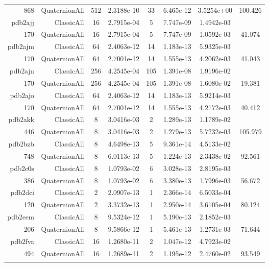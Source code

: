 \begin{xltabular}{\textwidth}{r|rcS[table-format=1.4e+2]cS[table-format=1.3e+2]S[table-format=1.4e+2]S[table-format=-1.3]}
868 & QuaternionAll & 512 & 2.3188e-10 & 33 & 6.465e-12 & 3.5254e+00 & 100.426\\  \addlinespace
pdb2ajj & ClassicAll & 16 & 2.7915e-04 & 5 & 7.747e-09 & 1.4942e-03 & \\
170 & QuaternionAll & 16 & 2.7915e-04 & 5 & 7.747e-09 & 1.0592e-03 & 41.074\\  \addlinespace
pdb2ajm & ClassicAll & 64 & 2.4063e-12 & 14 & 1.183e-13 & 5.9325e-03 & \\
170 & QuaternionAll & 64 & 2.7001e-12 & 14 & 1.555e-13 & 4.2062e-03 & 41.043\\  \addlinespace
pdb2ajn & ClassicAll & 256 & 4.2545e-04 & 105 & 1.391e-08 & 1.9196e-02 & \\
170 & QuaternionAll & 256 & 4.2545e-04 & 105 & 1.391e-08 & 1.6080e-02 & 19.381\\  \addlinespace
pdb2ajo & ClassicAll & 64 & 2.4063e-12 & 14 & 1.183e-13 & 5.9214e-03 & \\
170 & QuaternionAll & 64 & 2.7001e-12 & 14 & 1.555e-13 & 4.2172e-03 & 40.412\\  \addlinespace
pdb2akk & ClassicAll & 8 & 3.0416e-03 & 2 & 1.289e-13 & 1.1789e-02 & \\
446 & QuaternionAll & 8 & 3.0416e-03 & 2 & 1.279e-13 & 5.7232e-03 & 105.979\\  \addlinespace
pdb2bzb & ClassicAll & 8 & 4.6498e-13 & 5 & 9.361e-14 & 4.5133e-02 & \\
748 & QuaternionAll & 8 & 6.0113e-13 & 5 & 1.224e-13 & 2.3438e-02 & 92.561\\  \addlinespace
pdb2c0s & ClassicAll & 8 & 1.0793e-02 & 6 & 3.028e-13 & 2.8195e-03 & \\
386 & QuaternionAll & 8 & 1.0793e-02 & 6 & 3.380e-13 & 1.7996e-03 & 56.672\\  \addlinespace
pdb2dci & ClassicAll & 2 & 2.0907e-13 & 1 & 2.366e-14 & 6.5033e-04 & \\
120 & QuaternionAll & 2 & 3.3732e-13 & 1 & 2.950e-14 & 3.6105e-04 & 80.124\\  \addlinespace
pdb2eem & ClassicAll & 8 & 9.5324e-12 & 1 & 5.190e-13 & 2.1852e-03 & \\
206 & QuaternionAll & 8 & 9.5866e-12 & 1 & 5.461e-13 & 1.2731e-03 & 71.644\\  \addlinespace
pdb2fva & ClassicAll & 16 & 1.2680e-11 & 2 & 1.047e-12 & 4.7923e-02 & \\
494 & QuaternionAll & 16 & 1.2689e-11 & 2 & 1.195e-12 & 2.4760e-02 & 93.549\\  \addlinespace

\end{xltabular}

